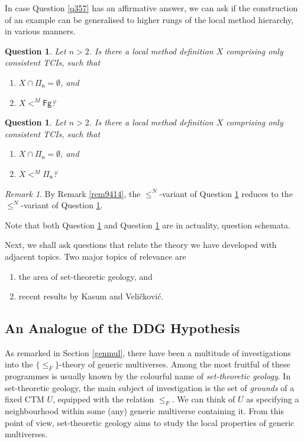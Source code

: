 \documentclass[12pt, twoside]{memoir}
\numberwithin{equation}{section}
\newtheorem{ques}[thm]{Question}
\theoremstyle{definition}
\theoremstyle{remark}
\newtheorem{rem}[thm]{Remark}
\theoremstyle{definition}
\theoremstyle{definition}
\theoremstyle{definition}
\theoremstyle{remark}
\begin{document}
In case Question \ref{q357} has an affirmative answer, we can ask if the construction of an example can be generalised to higher rungs of the local method hierarchy, in various manners.

\begin{ques}\label{q417}
Let $n > 2$. Is there a local method definition $X$ comprising only consistent TCIs, such that
\begin{enumerate}[label=(\arabic*)]
    \item $X \cap \mathsf{\Pi_n} = \emptyset$, and
    \item $X <^M \mathsf{Fg}$?
\end{enumerate}
\end{ques}

\begin{ques}\label{q418}
Let $n > 2$. Is there a local method definition $X$ comprising only consistent TCIs, such that
\begin{enumerate}[label=(\arabic*)]
    \item $X \cap \mathsf{\Pi_n} = \emptyset$, and
    \item $X <^M \mathsf{\Pi_n}$?
\end{enumerate}
\end{ques}

\begin{rem}
By Remark \ref{rem9414}, the $\leq^N$-variant of Question \ref{q418} reduces to the $\leq^N$-variant of Question \ref{q417}.
\end{rem}

Note that both Question \ref{q417} and Question \ref{q418} are in actuality, question schemata.

Next, we shall ask questions that relate the theory we have developed with adjacent topics. Two major topics of relevance are
\begin{enumerate}[label=(\Roman*)]
    \item the area of set-theoretic geology, and
    \item recent results by Kasum and Veli\v{c}kovi\'{c}.
\end{enumerate}

\subsection{An Analogue of the DDG Hypothesis}

As remarked in Section \ref{genmul}, there have been a multitude of investigations into the $\{\leq_F\}$-theory of generic multiverses. Among the most fruitful of these programmes is usually known by the colourful name of \emph{set-theoretic geology}. In set-theoretic geology, the main subject of investigation is the set of \emph{grounds} of a fixed CTM $U$, equipped with the relation $\leq_F$. We can think of $U$ as specifying a neighbourhood within some (any) generic multiverse containing it. From this point of view, set-theoretic geology aims to study the local properties of generic multiverses.
\end{document}

